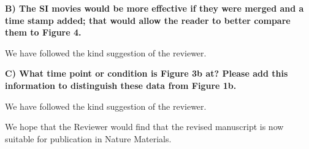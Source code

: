 \documentclass[11pt]{article}
\begin{document}
\vspace{1em}

\singlespacing

{\bf
B) The SI movies would be more effective if they were merged and a time stamp added; that would allow the reader to better compare them to Figure 4.
}


\bigskip
\doublespacing
We have followed the kind suggestion of the reviewer. 


\vspace{1em}

\singlespacing

{\bf
C) What time point or condition is Figure 3b at? Please add this information to distinguish these data from Figure 1b.
}



\bigskip
\doublespacing

We have followed the kind suggestion of the reviewer. 



We hope that the Reviewer would find that the revised manuscript is now suitable for publication in Nature Materials. 
\end{document}
